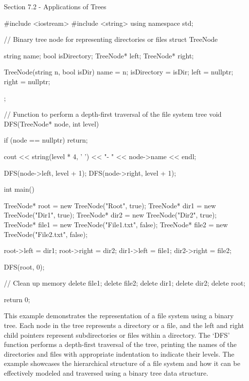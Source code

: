 \begin{notes}{Section 7.2 - Applications of Trees}
\begin{highlight}
    \begin{code}[C++]
    #include <iostream>
    #include <string>
    using namespace std;
    
    // Binary tree node for representing directories or files
    struct TreeNode {
        string name;
        bool isDirectory;
        TreeNode* left;
        TreeNode* right;
    
        TreeNode(string n, bool isDir) {
            name = n;
            isDirectory = isDir;
            left = nullptr;
            right = nullptr;
        }
    };
    
    // Function to perform a depth-first traversal of the file system tree
    void DFS(TreeNode* node, int level) {
        if (node == nullptr) return;
        
        cout << string(level * 4, ' ') << "- " << node->name << endl;
    
        DFS(node->left, level + 1);
        DFS(node->right, level + 1);
    }
    
    int main() {
        TreeNode* root = new TreeNode("Root", true);
        TreeNode* dir1 = new TreeNode("Dir1", true);
        TreeNode* dir2 = new TreeNode("Dir2", true);
        TreeNode* file1 = new TreeNode("File1.txt", false);
        TreeNode* file2 = new TreeNode("File2.txt", false);
    
        root->left = dir1;
        root->right = dir2;
        dir1->left = file1;
        dir2->right = file2;
    
        DFS(root, 0);
    
        // Clean up memory
        delete file1;
        delete file2;
        delete dir1;
        delete dir2;
        delete root;
    
        return 0;
    }  
    \end{code}
        This example demonstrates the representation of a file system using a binary tree. Each node in the tree represents a directory or a file, and the left and right child pointers represent subdirectories or files within a directory. The `DFS' function performs a depth-first traversal of the tree, printing the 
        names of the directories and files with appropriate indentation to indicate their levels. The example showcases the hierarchical structure of a file system and how it can be effectively modeled and traversed using a binary tree data structure.
    \end{highlight}
\end{notes}


